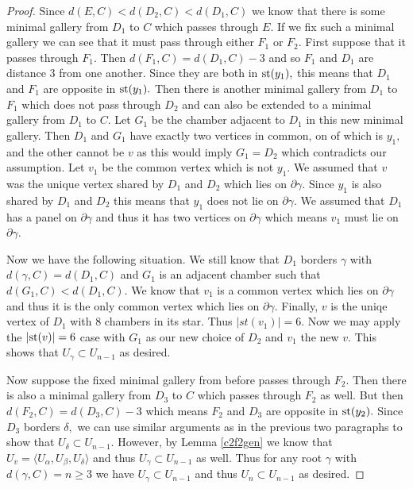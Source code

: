 \documentclass[class=book, crop=false]{standalone}
\begin{document}
\begin{proof}
Since $d(E,C)<d(D_2,C)<d(D_1,C)$ we know that there is some minimal gallery from $D_1$ to $C$ which passes through $E.$ If we fix such a minimal gallery we can see that it must pass through either $F_1$ or $F_2.$ First suppose that it passes through $F_1.$ Then $d(F_1,C)=d(D_1,C)-3$ and so $F_1$ and $D_1$ are distance 3 from one another. Since they are both in $\mathrm{st}(y_1),$ this means that $D_1$ and $F_1$ are opposite in $\mathrm{st}(y_1).$ Then there is another minimal gallery from $D_1$ to $F_1$ which does not pass through $D_2$ and can also be extended to a minimal gallery from $D_1$ to $C.$ Let $G_1$ be the chamber adjacent to $D_1$ in this new minimal gallery. Then $D_1$ and $G_1$ have exactly two vertices in common, on of which is $y_1,$ and the other cannot be $v$ as this would imply $G_1=D_2$ which contradicts our assumption. Let $v_1$ be the common vertex which is not $y_1.$ We assumed that $v$ was the unique vertex shared by $D_1$ and $D_2$ which lies on $\partial \gamma.$ Since $y_1$ is also shared by $D_1$ and $D_2$ this means that $y_1$ does not lie on $\partial \gamma.$ We assumed that $D_1$ has a panel on $\partial \gamma$ and thus it has two vertices on $\partial \gamma$ which means $v_1$ must lie on $\partial \gamma.$

Now we have the following situation. We still know that $D_1$ borders $\gamma$ with $d(\gamma,C)=d(D_1,C)$ and $G_1$ is an adjacent chamber such that $d(G_1,C)<d(D_1,C).$ We know that $v_1$ is a common vertex which lies on $\partial\gamma$ and thus it is the only common vertex which lies on $\partial\gamma.$ Finally, $v$ is the uniqe vertex of $D_1$ with 8 chambers in its star. Thus $|st(v_1)|=6.$ Now we may apply the $|\mathrm{st}(v)|=6$ case with $G_1$ as our new choice of $D_2$ and $v_1$ the new $v.$ This shows that $U_\gamma\subset U_{n-1}$ as desired.

Now suppose the fixed minimal gallery from before passes through $F_2.$ Then there is also a minimal gallery from $D_3$ to $C$ which passes through $F_2$ as well. But then $d(F_2,C)=d(D_3,C)-3$ which means $F_2$ and $D_3$ are opposite in $\mathrm{st}(y_2).$ Since $D_3$ borders $\delta,$ we can use similar arguments as in the previous two paragraphs to show that $U_\delta\subset U_{n-1}.$ However, by Lemma \ref{c2f2gen} we know that $U_v=\langle U_\alpha,U_\beta,U_\delta\rangle$ and thus $U_\gamma\subset U_{n-1}$ as well. Thus for any root $\gamma$ with $d(\gamma,C)=n\ge 3$ we have $U_\gamma\subset U_{n-1}$ and thus $U_n\subset U_{n-1}$ as desired.
\end{proof}
\end{document}
